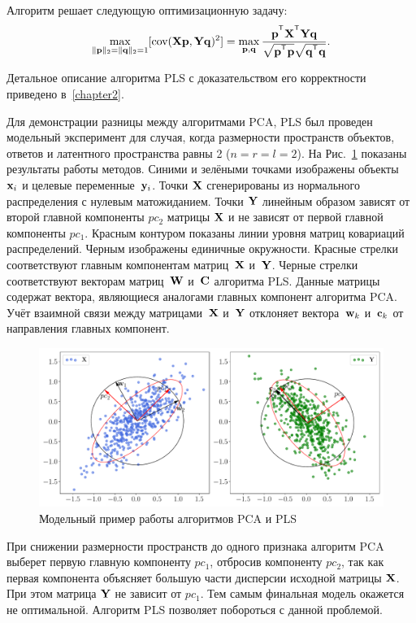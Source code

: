 Алгоритм решает следующую оптимизационную задачу:
\begin{equation}
	\max_{\|\bp\|_{2}=\|\bq\|_{2}=1}[ \text{cov}(\bX \bp, \bY \bq)^{2}] = \max_{\bp, \bq} \frac{\bp^{\T} \bX^{\T} \bY \bq}{\sqrt{\bp^{\T} \bp} \sqrt{\bq^{\T} \bq}}.
	\label{ch1:eq:pls_max_cov}
\end{equation}

Детальное описание алгоритма PLS с доказательством его корректности приведено в~\autoref{chapter2}.

Для демонстрации разницы между алгоритмами PCA, PLS был проведен модельный эксперимент для случая, когда размерности пространств объектов, ответов и латентного пространства равны 2 ($n = r = l = 2$).
На Рис.~\ref{ch1:fig:pls_toy_example} показаны результаты работы методов. 
Синими и зелёными точками изображены объекты~$\mathbf{x}_i$ и целевые переменные~$\mathbf{y}_i$. 
Точки $\mathbf{X}$ сгенерированы из нормального распределения с нулевым матожиданием. 
Точки $\mathbf{Y}$ линейным образом зависят от второй  главной компоненты $pc_2$ матрицы $\mathbf{X}$ и не зависят от первой главной компоненты $pc_1$.
Красным контуром показаны линии уровня матриц ковариаций распределений. 
Черным изображены единичные окружности. 
Красные стрелки соответствуют главным компонентам матриц~$\mathbf{X}$ и~$\mathbf{Y}$. 
Черные стрелки соответствуют векторам матриц~$\mathbf{W}$ и~$\mathbf{C}$ алгоритма PLS. 
Данные матрицы содержат вектора, являющиеся аналогами главных компонент алгоритма PCA.
Учёт взаимной связи между матрицами~$\mathbf{X}$ и~$\mathbf{Y}$ отклоняет вектора~$\mathbf{w}_k$ и~$\mathbf{c}_k$ от направления главных компонент. 
\begin{figure}[h]
	\centering
	\includegraphics[width=\linewidth]{figs/ch1/pls_toy_example}
	\caption{Модельный пример работы алгоритмов PCA и PLS}
	\label{ch1:fig:pls_toy_example}
\end{figure}

При снижении размерности пространств до одного признака алгоритм PCA выберет первую главную компоненту $pc_1$, отбросив компоненту $pc_2$, так как первая компонента объясняет большую части дисперсии исходной матрицы $\mathbf{X}$. 
При этом матрица $\mathbf{Y}$ не зависит от $pc_1$. 
Тем самым финальная модель окажется не оптимальной.
Алгоритм PLS позволяет побороться с данной проблемой.

